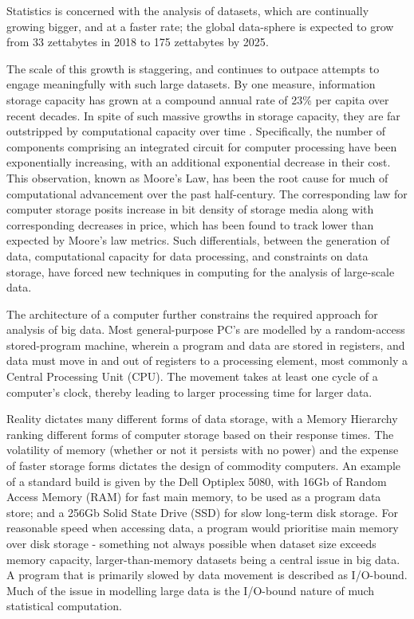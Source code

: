 Statistics is concerned with the analysis of datasets, which are continually growing bigger, and at a faster rate; the global data-sphere is expected to grow from 33 zettabytes in 2018 to 175 zettabytes by 2025\cite{rydning2018digitization}.

The scale of this growth is staggering, and continues to outpace attempts to engage meaningfully with such large datasets.
By one measure, information storage capacity has grown at a compound annual rate of 23\% per capita over recent decades\cite{hilbert2011world}.
In spite of such massive growths in storage capacity, they are far outstripped by computational capacity over time \cite{fontana2018moore}.
Specifically, the number of components comprising an integrated circuit for computer processing have been exponentially increasing, with an additional exponential decrease in their cost\cite{moore1975progress}.
This observation, known as Moore's Law, has been the root cause for much of computational advancement over the past half-century.
The corresponding law for computer storage posits increase in bit density of storage media along with corresponding decreases in price, which has been found to track lower than expected by Moore's law metrics.
Such differentials, between the generation of data, computational capacity for data processing, and constraints on data storage, have forced new techniques in computing for the analysis of large-scale data.

The architecture of a computer further constrains the required approach for analysis of big data.
Most general-purpose PC's are modelled by a random-access stored-program machine, wherein a program and data are stored in registers, and data must move in and out of registers to a processing element, most commonly a Central Processing Unit (CPU).
The movement takes at least one cycle of a computer's clock, thereby leading to larger processing time for larger data.

Reality dictates many different forms of data storage, with a Memory Hierarchy ranking different forms of computer storage based on their response times\cite{toy1986computer}.
The volatility of memory (whether or not it persists with no power) and the expense of faster storage forms dictates the design of commodity computers.
An example of a standard build is given by the Dell Optiplex 5080, with 16Gb of Random Access Memory (RAM) for fast main memory, to be used as a program data store; and a 256Gb Solid State Drive (SSD) for slow long-term disk storage\cite{cornell2021standardcomp}.
For reasonable speed when accessing data, a program would prioritise main memory over disk storage - something not always possible when dataset size exceeds memory capacity, larger-than-memory datasets being a central issue in big data.
A program that is primarily slowed by data movement is described as I/O-bound.
Much of the issue in modelling large data is the I/O-bound nature of much statistical computation.

